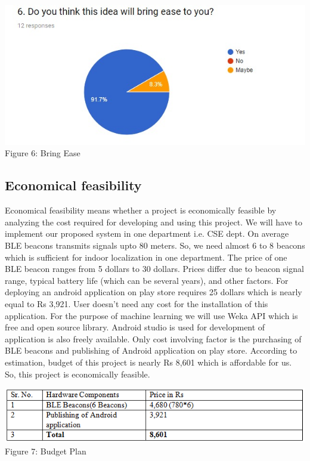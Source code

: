 \documentclass{article}
\begin{document}
\begin{center}
\includegraphics[scale=0.7]{graph6}
\\Figure 6: Bring Ease
\end{center}

 

\subsection{Economical feasibility}

Economical feasibility means whether a project is economically feasible by analyzing the cost required for developing and using this project. We will have to implement our proposed system in one department i.e. CSE dept. On average BLE beacons transmits signals upto 80 meters. So, we need almost 6 to 8 beacons which is sufficient for indoor localization in one department. The price of one BLE beacon ranges from 5 dollars to 30 dollars. Prices differ due to beacon signal range, typical battery life (which can be several years), and other factors. For deploying an android application on play store requires 25 dollars which is nearly equal to Rs 3,921. User doesn't need any cost for the installation of this application. For the purpose of machine learning we will use Weka API which is free and open source library. Android studio is used for development of application is also freely available. Only cost
involving factor is the purchasing of BLE beacons and publishing of Android application on play store. According to estimation, budget of this project is nearly Rs 8,601 which is affordable for us. So, this project is economically feasible.

\begin{center}
\includegraphics[scale=0.8]{table3}
\\Figure 7: Budget Plan
\end{center}
\end{document}
